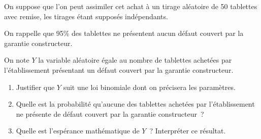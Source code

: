 \par
On suppose que l'on peut assimiler cet achat à un tirage aléatoire de 50 tablettes avec remise, les tirages étant supposés indépendants.
\par
On rappelle que 95\% des tablettes ne présentent aucun défaut couvert par la garantie constructeur.
\par
On note $Y$ la variable aléatoire égale au nombre de tablettes achetées par l'établissement présentant un défaut couvert par la garantie constructeur.
\begin{enumerate}
     \item %
     Justifier que $Y$ suit une loi binomiale dont on précisera les paramètres.
     \item %
     Quelle est la probabilité qu'aucune des tablettes achetées par l'établissement ne présente de défaut couvert par la garantie constructeur~?
     \item %
     \par
     Quelle est l'espérance mathématique de $Y$~? Interpréter ce résultat.
\end{enumerate}
